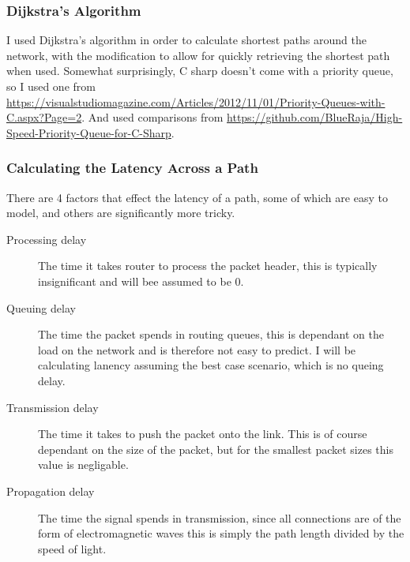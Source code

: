 \documentclass[12pt]{article}
\begin{document}
\subsubsection{Dijkstra's Algorithm}

I used Dijkstra's algorithm in order to calculate shortest paths around the network, with the modification to allow for quickly retrieving the shortest path when used. Somewhat surprisingly, C sharp doesn't come with a priority queue, so I used one from \url{https://visualstudiomagazine.com/Articles/2012/11/01/Priority-Queues-with-C.aspx?Page=2}. And used comparisons from \url{https://github.com/BlueRaja/High-Speed-Priority-Queue-for-C-Sharp}.

\subsubsection{Calculating the Latency Across a Path}

There are 4 factors that effect the latency of a path, some of which are easy to model, and others are significantly more tricky.

\begin{description}
\item[Processing delay] The time it takes router to process the packet header, this is typically insignificant and will bee assumed to be 0.
\item[Queuing delay]  The time the packet spends in routing queues, this is dependant on the load on the network and is therefore not easy to predict. I will be calculating lanency assuming the best case scenario, which is no queing delay.
\item[Transmission delay] The time it takes to push the packet onto the link. This is of course dependant on the size of the packet, but for the smallest packet sizes this value is negligable. 
\item[Propagation delay] The time the signal spends in transmission, since all connections are of the form of electromagnetic waves this is simply the path length divided by the speed of light.
\end{description}
\end{document}
